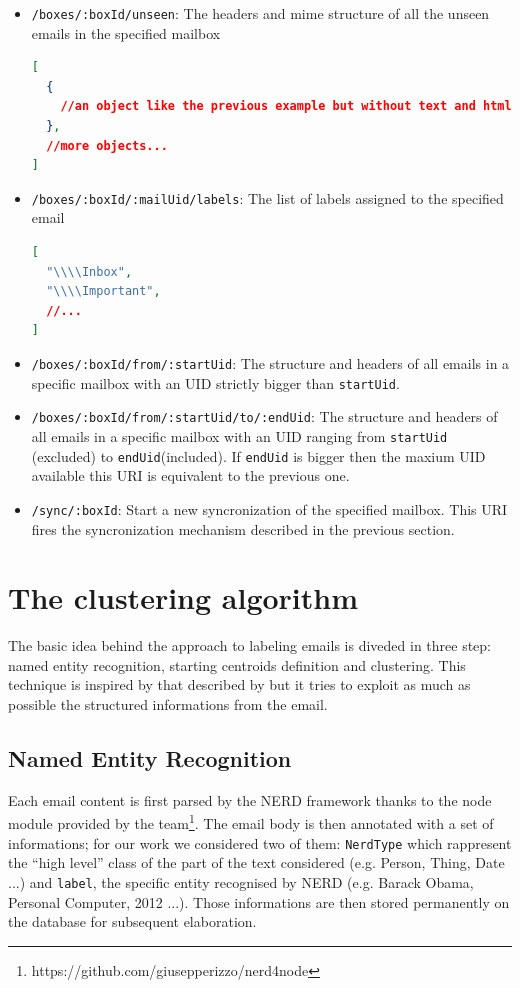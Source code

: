 \documentclass[a4paper,12pt]{report}
\begin{document}
\begin{itemize}
\begin{lstlisting}[language=JSON]
  ]
}
\end{lstlisting}
\item \texttt{/boxes/:boxId/unseen}: The headers and mime structure of  all the unseen emails in the specified mailbox
\begin{lstlisting}[language=JSON]
[
  {
    //an object like the previous example but without text and html 
  },
  //more objects...
]
\end{lstlisting}
\item \texttt{/boxes/:boxId/:mailUid/labels}: The list of labels assigned to the specified email
\begin{lstlisting}[language=JSON]
[
  "\\\\Inbox",
  "\\\\Important",
  //...
]
\end{lstlisting}
\item \texttt{/boxes/:boxId/from/:startUid}: The structure and headers of all emails in a specific mailbox with an UID strictly bigger than \texttt{startUid}.
\item \texttt{/boxes/:boxId/from/:startUid/to/:endUid}: The structure and headers of all emails in a specific mailbox with an UID ranging from \texttt{startUid} (excluded) to \texttt{endUid}(included). If \texttt{endUid} is bigger then the maxium UID available this URI is equivalent to the previous one.
\item \texttt{/sync/:boxId}: Start a new syncronization of the specified mailbox. This URI fires the syncronization mechanism described in the previous section.
\end{itemize}

\section{The clustering algorithm}
The basic idea behind the approach to labeling emails is diveded in three step: named entity recognition, starting centroids definition and clustering. This technique is inspired by that described by \cite{Manco2008} but it tries to exploit as much as possible the structured informations from the email.

\subsection{Named Entity Recognition}
Each email content is first parsed by the NERD framework thanks to the node module provided by the team\footnote{https://github.com/giusepperizzo/nerd4node}. The email body is then annotated with a set of informations; for our work we considered two of them: \texttt{NerdType} which rappresent the ``high level'' class of the part of the text considered (e.g. Person, Thing, Date ...) and \texttt{label}, the specific entity recognised by NERD (e.g. Barack Obama, Personal Computer, 2012 ...). 
Those informations are then stored permanently on the database for subsequent elaboration.
\end{document}
